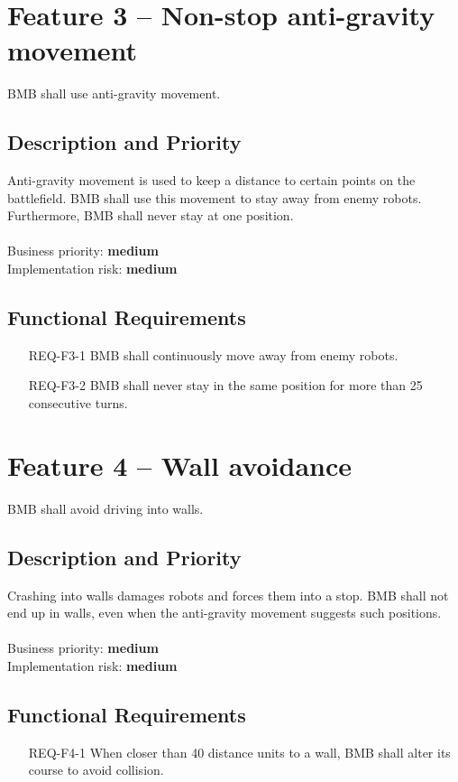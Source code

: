 \documentclass{scrreprt}
\begin{document}
\section{Feature 3 -- Non-stop anti-gravity movement}
BMB shall use anti-gravity movement.
	
\subsection{Description and Priority}
Anti-gravity movement is used to keep a distance to certain points on the battlefield. BMB shall use this movement to stay away from enemy robots. Furthermore, BMB shall never stay at one position.\\\\Business priority: \textbf{medium}\\
Implementation risk: \textbf{medium}

\subsection{Functional Requirements}
\begin{itemize}
\item[REQ-F3-1] BMB shall continuously move away from enemy robots.
\item[REQ-F3-2] BMB shall never stay in the same position for more than 25 consecutive turns.
\end{itemize}

\section{Feature 4 -- Wall avoidance}
BMB shall avoid driving into walls.

\subsection{Description and Priority}
Crashing into walls damages robots and forces them into a stop. BMB shall not end up in walls, even when the anti-gravity movement suggests such positions.\\\\Business priority: \textbf{medium}\\
Implementation risk: \textbf{medium}

\subsection{Functional Requirements}
\begin{itemize}
\item[REQ-F4-1] When closer than 40 distance units to a wall, BMB shall alter its course to avoid collision.
\end{itemize}
\end{document}
